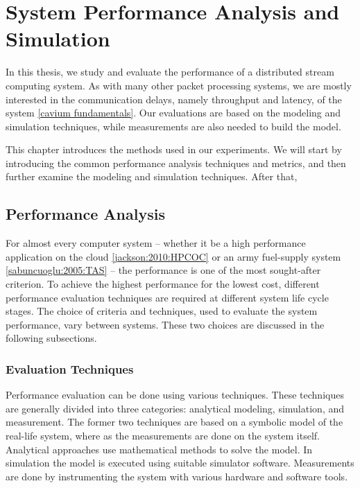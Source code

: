 \chapter{System Performance Analysis and Simulation}
\label{chapter:system-performance-analysis-and-simulation}
In this thesis, we study and evaluate the performance of a distributed stream computing system. As with many other packet processing systems, we are mostly interested in the communication delays, namely throughput and latency, of the system \ref{cavium fundamentals}. Our evaluations are based on the modeling and simulation techniques, while measurements are also needed to build the model.

This chapter introduces the methods used in our experiments. We will start by introducing the common performance analysis techniques and metrics, and then further examine the modeling and simulation techniques. After that, 

\section{Performance Analysis}
For almost every computer system -- whether it be a high performance application on the cloud \ref{jackson:2010:HPCOC} or an army fuel-supply system \ref{sabuncuoglu:2005:TAS} -- the performance is one of the most sought-after criterion. To achieve the highest performance for the lowest cost, different performance evaluation techniques are required at different system life cycle stages. The choice of criteria and techniques, used to evaluate the system performance, vary between systems. These two choices are discussed in the following subsections. \cite{jain:1991:AOCSPA}

\subsection{Evaluation Techniques}
Performance evaluation can be done using various techniques. These techniques are generally divided into three categories: analytical modeling, simulation, and measurement. The former two techniques are based on a symbolic model of the real-life system, where as the measurements are done on the system itself. Analytical approaches use mathematical methods to solve the model. In simulation the model is executed using suitable simulator software. Measurements are done by instrumenting the system with various hardware and software tools. \cite{jain:1991:AOCSPA}

